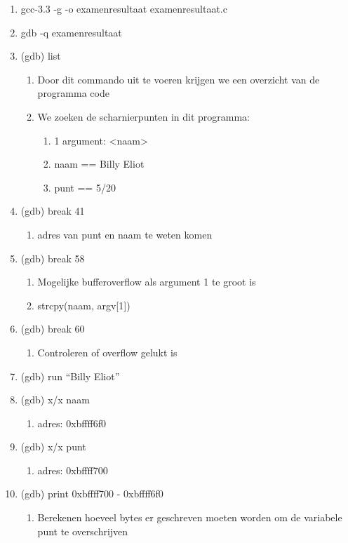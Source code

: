 \begin{enumerate}
  \item gcc-3.3 -g -o examenresultaat examenresultaat.c
  \item gdb -q examenresultaat
  \item (gdb) list
  	\begin{enumerate}
  	\item Door dit commando uit te voeren krijgen we een overzicht van de programma code
  	\item We zoeken de scharnierpunten in dit programma:
  		\begin{enumerate}
  		\item 1 argument: \textless naam\textgreater
  		\item naam == Billy Eliot
  		\item punt == 5/20
  		\end{enumerate}
  	\end{enumerate}
  \item (gdb) break 41
  	\begin{enumerate}
  	\item adres van punt en naam te weten komen
  	\end{enumerate}
  \item (gdb) break 58
  	\begin{enumerate}
  	\item Mogelijke bufferoverflow als argument 1 te groot is
  	\item strcpy(naam, argv[1])
  	\end{enumerate}
  \item (gdb) break 60
  	\begin{enumerate}
  	\item Controleren of overflow gelukt is
  	\end{enumerate}
  \item (gdb) run ``Billy Eliot''
  \item (gdb) x/x naam
  	\begin{enumerate}
  	\item adres: 0xbffff6f0
  	\end{enumerate}
  \item (gdb) x/x punt
  	\begin{enumerate}
  	\item adres: 0xbffff700
  	\end{enumerate}
  \item (gdb) print 0xbffff700 - 0xbffff6f0
  	\begin{enumerate}
  	\item Berekenen hoeveel bytes er geschreven moeten worden om de variabele punt te overschrijven

\end{enumerate}
\end{enumerate}
